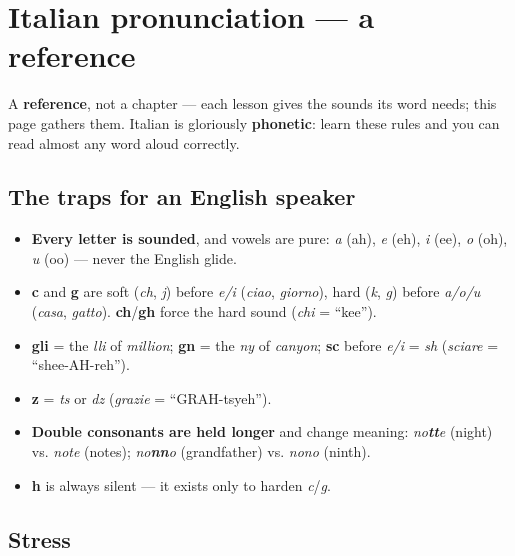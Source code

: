 
\chapter*{Italian pronunciation --- a reference}

A \textbf{reference}, not a chapter — each lesson gives the sounds its word needs; this page gathers them. Italian is gloriously \textbf{phonetic}: learn these rules and you can read almost any word aloud correctly.

\section*{The traps for an English speaker}

\begin{itemize}
\raggedright
\setlength{\itemsep}{0.35em}
  \item \textbf{Every letter is sounded}, and vowels are pure: \emph{a} (ah), \emph{e} (eh), \emph{i} (ee), \emph{o} (oh), \emph{u} (oo) — never the English glide.
  \item \textbf{c} and \textbf{g} are soft (\emph{ch}, \emph{j}) before \emph{e/i} (\emph{ciao}, \emph{giorno}), hard (\emph{k}, \emph{g}) before \emph{a/o/u} (\emph{casa}, \emph{gatto}). \textbf{ch}/\textbf{gh} force the hard sound (\emph{chi} = \textquotedblleft{}kee\textquotedblright{}).
  \item \textbf{gli} = the \emph{lli} of \emph{million}; \textbf{gn} = the \emph{ny} of \emph{canyon}; \textbf{sc} before \emph{e/i} = \emph{sh} (\emph{sciare} = \textquotedblleft{}shee-AH-reh\textquotedblright{}).
  \item \textbf{z} = \emph{ts} or \emph{dz} (\emph{grazie} = \textquotedblleft{}GRAH-tsyeh\textquotedblright{}).
  \item \textbf{Double consonants are held longer} and change meaning: \emph{no\textbf{tt}e} (night) vs. \emph{note} (notes); \emph{no\textbf{nn}o} (grandfather) vs. \emph{nono} (ninth).
  \item \textbf{h} is always silent — it exists only to harden \emph{c}/\emph{g}.
\end{itemize}

\section*{Stress}

